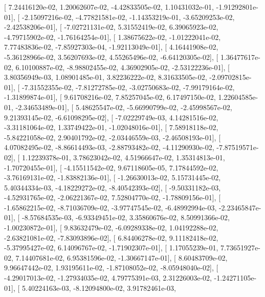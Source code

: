 \documentclass{article}
\begin{document}
       [  7.24416120e-02,   1.20062607e-02,  -4.42833505e-02,
          1.10431032e-01,  -1.91292801e-01],
       [ -2.15097216e-02,  -4.77821581e-02,  -1.14353219e-01,
         -3.65209253e-02,  -2.42538206e-01],
       [ -7.02721131e-02,   5.31552419e-02,   6.39065923e-02,
         -4.79715902e-02,  -1.76164254e-01],
       [  1.38675622e-02,  -1.01222041e-02,   7.77483836e-02,
         -7.85927303e-04,  -1.92113049e-01],
       [  4.16441908e-02,  -5.36128966e-02,   3.56207693e-02,
          4.55265496e-02,  -6.64120305e-02],
       [  1.36477617e-02,   6.10100887e-02,  -8.98802455e-02,
          4.36902905e-02,  -2.53122236e-01],
       [  3.80356949e-03,   1.08901485e-01,   3.82236222e-02,
          8.31633505e-02,  -2.09702815e-01],
       [ -7.31552355e-02,  -7.81272785e-02,  -3.02750683e-02,
         -7.99179164e-02,  -1.31899874e-01],
       [  9.61708216e-02,   7.85257045e-02,   6.17497150e-02,
          1.22604585e-01,  -2.34653489e-01],
       [  5.48625547e-02,  -5.66990799e-02,  -2.45998567e-02,
          9.21393145e-02,  -6.61098295e-02],
       [ -7.02229749e-03,   4.14281516e-02,  -3.31181064e-02,
          1.33749422e-01,  -1.02048016e-01],
       [  7.58918118e-02,  -5.84221058e-02,   2.90401792e-02,
         -2.03446559e-03,  -2.46508193e-01],
       [  4.07082495e-02,  -8.86614493e-03,  -2.88793482e-02,
         -4.11290930e-02,  -7.87519571e-02],
       [  1.12239378e-01,   3.78623042e-02,   4.51966647e-02,
          1.35314813e-01,  -1.70720455e-01],
       [ -4.15511542e-02,   9.67118605e-05,   7.17844592e-02,
         -3.76169131e-02,  -1.83882136e-01],
       [ -1.26630013e-02,   5.15731445e-02,   5.40344334e-03,
         -4.18229272e-02,  -8.40542393e-02],
       [ -9.50331182e-03,  -4.52931765e-02,  -2.06221367e-02,
          7.52804770e-02,  -1.78809156e-01],
       [ -1.65862215e-02,  -8.71036709e-02,  -3.97747545e-02,
         -6.48992994e-03,  -2.23465847e-01],
       [ -8.57684535e-03,  -6.93349451e-02,   3.35860676e-02,
          8.50991366e-02,  -1.00230872e-01],
       [  9.83632479e-02,  -6.09289338e-02,   1.04192288e-02,
         -2.63821081e-02,  -7.83093896e-02],
       [  6.84406278e-02,   9.11182418e-02,  -5.37995427e-02,
          6.14096767e-02,  -1.71902307e-01],
       [  1.17055239e-01,   7.73651927e-02,   7.14407681e-02,
          6.95381596e-02,  -1.30667147e-01],
       [  8.60483709e-02,   9.96647442e-02,   1.93195611e-02,
         -1.87108052e-02,  -8.05948040e-02],
       [ -4.29017013e-02,  -1.27934035e-02,   4.79775391e-03,
          2.31226003e-02,  -1.24271105e-01],
       [  5.40224163e-03,  -8.12094800e-02,   3.91782461e-03,
\end{document}
